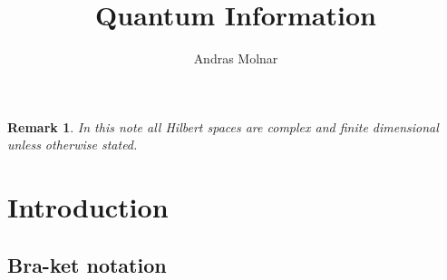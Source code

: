 \documentclass{article}
\title{Quantum Information}
\author{Andras Molnar}
\newtheorem{remark}{Remark}
\theoremstyle{definition}
\begin{document}
\maketitle

\begin{remark}
  In this note all Hilbert spaces are complex and finite dimensional unless otherwise stated.
\end{remark}


\section{Introduction}

\subsection{Bra-ket notation}
\end{document}
